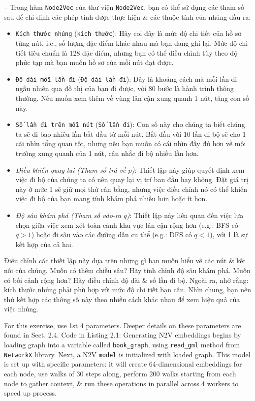 \documentclass{article}
\begin{document}
\begin{itemize}
\begin{itemize}
\begin{itemize}
           -- Trong hàm {\tt Node2Vec} của thư viện {\tt Node2Vec}, bạn có thể sử dụng các tham số sau để chỉ định các phép tính được thực hiện \& các thuộc tính của nhúng đầu ra:
           \begin{itemize}
               \item {\tt Kích thước nhúng} ({\tt kích thước}): Hãy coi đây là mức độ chi tiết của hồ sơ từng nút, i.e., số lượng đặc điểm khác nhau mà bạn đang ghi lại. Mức độ chi tiết tiêu chuẩn là 128 đặc điểm, nhưng bạn có thể điều chỉnh tùy theo độ phức tạp mà bạn muốn hồ sơ của mỗi nút đạt được.
               \item {\tt Độ dài mỗi lần đi} ({\tt Độ dài lần đi}): Đây là khoảng cách mà mỗi lần đi ngẫu nhiên qua đồ thị của bạn đi được, với 80 bước là hành trình thông thường. Nếu muốn xem thêm về vùng lân cận xung quanh 1 nút, tăng con số này.
               \item {\tt Số lần đi trên mỗi nút} ({\tt Số lần đi}): Con số này cho chúng ta biết chúng ta sẽ đi bao nhiêu lần bắt đầu từ mỗi nút. Bắt đầu với 10 lần đi bộ sẽ cho 1 cái nhìn tổng quan tốt, nhưng nếu bạn muốn có cái nhìn đầy đủ hơn về môi trường xung quanh của 1 nút, cân nhắc đi bộ nhiều lần hơn.
               \item {\it Điều khiển quay lui (Tham số trả về $p$)}: Thiết lập này giúp quyết định xem việc đi bộ của chúng ta có nên quay lại vị trí ban đầu hay không. Đặt giá trị này ở mức 1 sẽ giữ mọi thứ cân bằng, nhưng việc điều chỉnh nó có thể khiến việc đi bộ của bạn mang tính khám phá nhiều hơn hoặc ít hơn.
               \item {\it Độ sâu khám phá (Tham số vào-ra $q$)}: Thiết lập này liên quan đến việc lựa chọn giữa việc xem xét toàn cảnh khu vực lân cận rộng hơn (e.g.: BFS có $q > 1$) hoặc đi sâu vào các đường dẫn cụ thể (e.g.: DFS có $q < 1$), với 1 là sự kết hợp của cả hai.
           \end{itemize}
           Điều chỉnh các thiết lập này dựa trên những gì bạn muốn hiểu về các nút \& kết nối của chúng. Muốn có thêm chiều sâu? Hãy tinh chỉnh độ sâu khám phá. Muốn có bối cảnh rộng hơn? Hãy điều chỉnh độ dài \& số lần đi bộ. Ngoài ra, nhớ rằng: kích thước nhúng phải phù hợp với mức độ chi tiết bạn cần. Nhìn chung, bạn nên thử kết hợp các thông số này theo nhiều cách khác nhau để xem hiệu quả của việc nhúng.

           For this exercise, use 1st 4 parameters. Deeper details on these parameters are found in Sect. 2.4. Code in {\sf Listing 2.1: Generating N2V embeddings} begins by loading graph into a variable called \verb|book_graph|, using \verb|read_gml| method from {\tt NetworkX} library. Next, a N2V {\tt model} is initialized with loaded graph. This model is set up with specific parameters: it will create 64-dimensional embeddings for each node, use walks of 30 steps along, perform 200 walks starting from each node to gather context, \& run these operations in parallel across 4 workers to speed up process.


\end{itemize}
\end{itemize}
\end{itemize}
\end{document}
